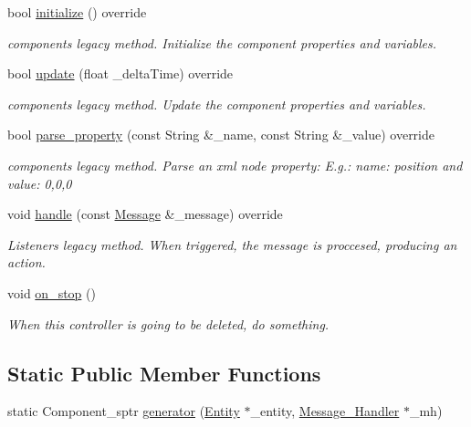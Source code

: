 \begin{DoxyCompactItemize}
\item 
bool \mbox{\hyperlink{classbanita_1_1_player___controller_a42c2960117c977daf72083452fb69e86}{initialize}} () override
\begin{DoxyCompactList}\small\item\em component\textquotesingle{}s legacy method. Initialize the component properties and variables. \end{DoxyCompactList}\item 
bool \mbox{\hyperlink{classbanita_1_1_player___controller_ab7c47cba21892cac0e9f8a366cf86ca8}{update}} (float \+\_\+delta\+Time) override
\begin{DoxyCompactList}\small\item\em component\textquotesingle{}s legacy method. Update the component properties and variables. \end{DoxyCompactList}\item 
bool \mbox{\hyperlink{classbanita_1_1_player___controller_ab25a1e791ce020ff226b6324cc2c5c67}{parse\+\_\+property}} (const String \&\+\_\+name, const String \&\+\_\+value) override
\begin{DoxyCompactList}\small\item\em component\textquotesingle{}s legacy method. Parse an xml node property\+: E.\+g.\+: name\+: position and value\+: 0,0,0 \end{DoxyCompactList}\item 
void \mbox{\hyperlink{classbanita_1_1_player___controller_a6c6aa3a387d36db7306ca557fbb100e6}{handle}} (const \mbox{\hyperlink{classbanita_1_1_message}{Message}} \&\+\_\+message) override
\begin{DoxyCompactList}\small\item\em Listener\textquotesingle{}s legacy method. When triggered, the message is proccesed, producing an action. \end{DoxyCompactList}\item 
void \mbox{\hyperlink{classbanita_1_1_player___controller_aedd233c9dcd10f9c8998f48a840f2e57}{on\+\_\+stop}} ()
\begin{DoxyCompactList}\small\item\em When this controller is going to be deleted, do something. \end{DoxyCompactList}\end{DoxyCompactItemize}
\subsection*{Static Public Member Functions}
\begin{DoxyCompactItemize}
\item 
static Component\+\_\+sptr \mbox{\hyperlink{classbanita_1_1_player___controller_a0596cf1ee132d70f8f7eabfb3be2cfbc}{generator}} (\mbox{\hyperlink{classbanita_1_1_entity}{Entity}} $\ast$\+\_\+entity, \mbox{\hyperlink{classbanita_1_1_message___handler}{Message\+\_\+\+Handler}} $\ast$\+\_\+mh)
\end{DoxyCompactItemize}
